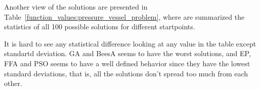 Another view of the solutions are presented in Table~\ref{function_values:pressure_vessel_problem}, where
are summarized the statistics of all 100 possible solutions for different startpoints.

\begin{table}[H]
\centering
\caption{Statistical Information about function values for Pressure Vessel Design}
\end{table}

It is hard to see any statistical  difference looking at any value in the table except standartd deviation.
GA and BeesA seems to have the worst solutions, and EP, FFA and PSO seems to have a well defined behavior
since they have the lowest standard deviations, that is, all the solutions don't spread too much from each
other.